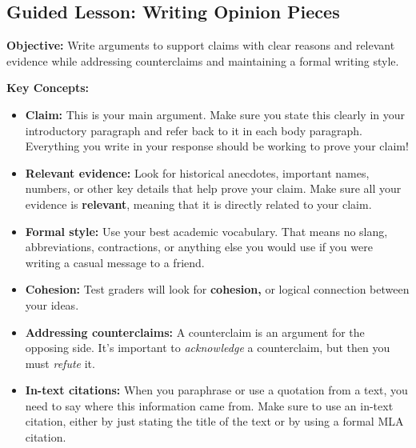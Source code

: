 \documentclass[12pt]{article}
\begin{document}
\subsection*{Guided Lesson: Writing Opinion Pieces}
\onehalfspacing

\begin{tcolorbox}[colframe=black!40, colback=gray!5, 
coltitle=black, colbacktitle=black!20, fonttitle=\bfseries\Large, 
title=Learning Objective, halign title=center, left=5pt, right=5pt, top=5pt, bottom=15pt]
\textbf{Objective:} Write arguments to support claims with clear reasons and relevant evidence while addressing counterclaims and maintaining a formal writing style.
\end{tcolorbox}

\vspace{1em}

\begin{tcolorbox}[colframe=black!60, colback=white, 
coltitle=black, colbacktitle=black!15, fonttitle=\bfseries\Large, 
title=Key Concepts and Vocabulary, halign title=center, left=10pt, right=10pt, top=10pt, bottom=15pt]
\textbf{Key Concepts:}
\begin{itemize}
    \item \textbf{Claim:} This is your main argument. Make sure you state this clearly in your introductory paragraph and refer back to it in each body paragraph. Everything you write in your response should be working to prove your claim!
    \item \textbf{Relevant evidence:} Look for historical anecdotes, important names, numbers, or other key details that help prove your claim. Make sure all your evidence is \textbf{relevant}, meaning that it is directly related to your claim. 
    \item \textbf{Formal style:} Use your best academic vocabulary. That means no slang, abbreviations, contractions, or anything else you would use if you were writing a casual message to a friend. 
    \item \textbf{Cohesion:} Test graders will look for  \textbf{cohesion,} or logical connection between your ideas. 
    \item \textbf{Addressing counterclaims:} A counterclaim is an argument for the opposing side. It's important to \textit{acknowledge} a counterclaim, but then you must \textit{refute} it.
    \item \textbf{In-text citations:} When you paraphrase or use a quotation from a text, you need to say where this information came from. Make sure to use an in-text citation, either by just stating the title of the text or by using a formal MLA citation.

    \end{itemize}



\end{tcolorbox}
\end{document}
